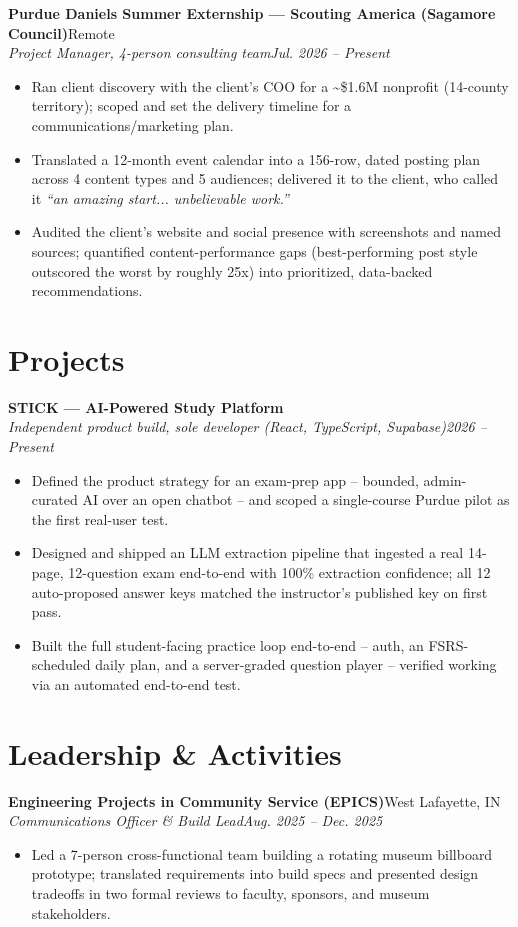 \documentclass[10pt,letterpaper]{article}
\newcommand{\entry}[4]{%
  \textbf{#1}\hfill #2\\[1pt]
  \textit{#3}\hfill \textit{#4}\\[2pt]
}
\begin{document}
\entry{Purdue Daniels Summer Externship --- Scouting America (Sagamore Council)}{Remote}{Project Manager, 4-person consulting team}{Jul. 2026 -- Present}
\begin{itemize}
  \item Ran client discovery with the client's COO for a \textasciitilde\$1.6M nonprofit (14-county territory); scoped and set the delivery timeline for a communications/marketing plan.
  \item Translated a 12-month event calendar into a 156-row, dated posting plan across 4 content types and 5 audiences; delivered it to the client, who called it \emph{``an amazing start... unbelievable work.''}
  \item Audited the client's website and social presence with screenshots and named sources; quantified content-performance gaps (best-performing post style outscored the worst by roughly 25x) into prioritized, data-backed recommendations.
\end{itemize}

\section*{Projects}
\entry{STICK --- AI-Powered Study Platform}{}{Independent product build, sole developer (React, TypeScript, Supabase)}{2026 -- Present}
\begin{itemize}
  \item Defined the product strategy for an exam-prep app -- bounded, admin-curated AI over an open chatbot -- and scoped a single-course Purdue pilot as the first real-user test.
  \item Designed and shipped an LLM extraction pipeline that ingested a real 14-page, 12-question exam end-to-end with 100\% extraction confidence; all 12 auto-proposed answer keys matched the instructor's published key on first pass.
  \item Built the full student-facing practice loop end-to-end -- auth, an FSRS-scheduled daily plan, and a server-graded question player -- verified working via an automated end-to-end test.
\end{itemize}

\section*{Leadership \& Activities}
\entry{Engineering Projects in Community Service (EPICS)}{West Lafayette, IN}{Communications Officer \& Build Lead}{Aug. 2025 -- Dec. 2025}
\begin{itemize}
  \item Led a 7-person cross-functional team building a rotating museum billboard prototype; translated requirements into build specs and presented design tradeoffs in two formal reviews to faculty, sponsors, and museum stakeholders.
\end{itemize}
\end{document}
